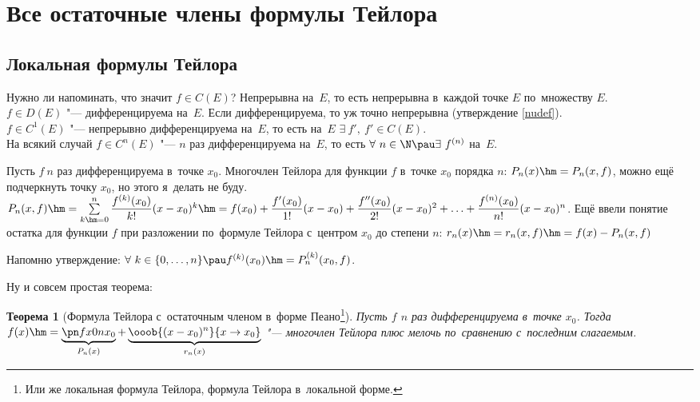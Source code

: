 \documentclass[a4paper,10pt,twoside]{article}
\newtheorem{The}{Теорема}[section]
\let\AVsection\section{}
\renewcommand\section{\newpage\scol\AVsection}
\newcommand{\scol}{  \renewcommand{\headrulewidth}{0.5pt}\fancyhead[RE,LO]{\thesection{} \leftmark} \fancyhead[LE,RO]{\thepage}}
\begin{document}
\section{Все остаточные члены формулы Тейлора}

\subsection{Локальная формулы Тейлора}

Нужно ли напоминать, что значит $f\in C(E)$? Непрерывна на~$E$, то есть непрерывна в~каждой точке $E$ по~множеству $E$.\\
$f\in D(E)$ "--- дифференцируема на~$E$. Если дифференцируема, то уж точно непрерывна (утверждение \ref{nudef}).\\
$f\in C^1(E)$ "--- непрерывно дифференцируема на~$E$, то есть на~$E$ $\exists\  f',\ f'\in C(E)$.\\
На всякий случай $f\in C^n(E)$ "--- $n$ раз дифференцируема на~$E$, то есть $\forall\  n\in\N\pau \exists\  f^{(n)}$ на~$E$.

Пусть $f\ n$ раз дифференцируема в~точке $x_0$. Многочлен Тейлора для функции $f$ в~точке $x_0$ порядка $n$: $P_n(x)\hm=P_n(x,f)$, можно ещё подчеркнуть точку $x_0$, но этого я~делать не буду.
$P_n(x,f)\hm=\sum\limits_{k\hm=0}^n\dfrac{f^{(k)}(x_0)}{k!}(x-x_0)^k\hm=f(x_0)+\dfrac{f'(x_0)}{1!}(x-x_0)+\dfrac{f''(x_0)}{2!}(x-x_0)^2+\ldots+
\dfrac{f^{(n)}(x_0)}{n!}(x-x_0)^n$.
Ещё ввели понятие остатка для функции $f$ при разложении по~формуле Тейлора с~центром $x_0$ до степени $n$: $r_n(x)\hm=r_n(x,f)\hm=f(x)-P_n(x,f)$

Напомню утверждение: $\forall\  k\in\{0,\ldots,n\}\pau f^{(k)}(x_0)\hm=P_n^{(k)}(x_0,f)$.

Ну и совсем простая теорема:

\begin{The}[Формула Тейлора с~остаточным членом в~форме Пеано\footnote{Или же локальная формула Тейлора, формула Тейлора в~локальной форме.}] Пусть
$f$ $n$ раз дифференцируема в~точке $x_0$. Тогда $f(x)\hm=\underbrace{\pn fx0n{x_0}}_{P_n(x)}+\underbrace{\vphantom{\pn fx0n{x_0}}\ooob{(x-x_0)^n}{x\to x_0}}_{r_n(x)}$ "---
многочлен Тейлора плюс мелочь  по~сравнению с~последним слагаемым.

\end{The}
\end{document}
